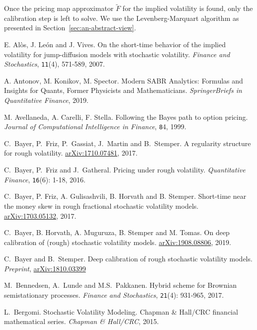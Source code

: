 \documentclass{article}
\theoremstyle{remark}
\begin{document}
Once the pricing map approximator $\widetilde{F}$  for the implied volatility
is found, only the calibration step is left to solve. We use the
Levenberg-Marquart algorithm as presented in Section~\ref{sec:an-abstract-view}.


\appendix
\newpage
\begin{thebibliography}{99}
E. Al\`os, J. Le\'on and J. Vives. 
On the short-time behavior of the implied volatility for jump-diffusion models with stochastic volatility. 
\textit{Finance and Stochastics}, {\tt 11}(4), 571-589, 2007.

A. Antonov, M. Konikov, M. Spector.
Modern SABR Analytics: Formulas and Insights for Quants, Former Physicists and Mathematicians.
\textit{SpringerBriefs in Quantitative Finance}, 2019.

M. Avellaneda, A. Carelli, F. Stella.
Following the Bayes path to option pricing.
\textit{Journal of Computational Intelligence in Finance}, {\tt 8}4, 1999.

C.~Bayer, P.~Friz, P.~Gassiat, J.~Martin and B.~Stemper.
A regularity structure for rough volatility. 
\href{https://arxiv.org/abs/1710.07481}{arXiv:1710.07481}, 2017.

C.~Bayer, P.~Friz  and J.~Gatheral.
Pricing under rough volatility. 
\textit{Quantitative Finance}, {\tt 16}(6): 1-18, 2016.

C.~Bayer, P. Friz, A. Gulisashvili, B. Horvath and B. Stemper.
Short-time near the money skew in rough fractional stochastic volatility models.
\href{https://arxiv.org/abs/1703.05132}{arXiv:1703.05132}, 2017.

C.~Bayer, B. Horvath, A. Muguruza, B. Stemper and M. Tomas.
On deep calibration of (rough) stochastic volatility models.
\href{https://arxiv.org/abs/1908.08806}{arXiv:1908.08806}, 2019.

C.~Bayer and B.~Stemper. Deep calibration of rough stochastic volatility models. \textit{Preprint}, \href{https://arxiv.org/pdf/1810.03399.pdf}{arXiv:1810.03399}

 M.~Bennedsen, A.~Lunde and M.S.~Pakkanen. 
Hybrid scheme for Brownian semistationary processes. 
\textit{Finance and Stochastics}, {\tt 21}(4): 931-965, 2017.

L.~Bergomi. Stochastic Volatility Modeling.
Chapman \& Hall/CRC financial mathematical series.  \textit{Chapman \& Hall/CRC}, 2015.


\end{thebibliography}
\end{document}
